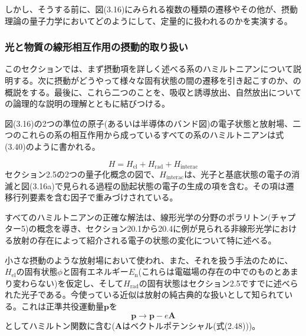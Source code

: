 \documentclass[11pt,a4j,uplatex]{jsarticle}
\begin{document}
しかし、そうする前に、図(3.16)にみられる複数の種類の遷移やその他が、摂動理論の量子力学においてどのようにして、定量的に扱われるのかを実演する。

\newpage
\subsubsection{光と物質の線形相互作用の摂動的取り扱い}
このセクションでは、まず摂動項を詳しく述べる系のハミルトニアンについて説明する。次に摂動がどうやって様々な固有状態の間の遷移を引き起こすのか、の概説をする。最後に、これら二つのことを、吸収と誘導放出、自然放出についての論理的な説明の理解とともに結びつける。

図(3.16)の2つの準位の原子(あるいは半導体のバンド図)の電子状態と放射場、二つのこれらの系の相互作用から成っているすべての系のハミルトニアンは式(3.40)のように書かれる。

\begin{equation}
  H=H_{\mathrm{el}}+H_{\mathrm{rad}}+H_{\mathrm{interac}}\tag{3.40}
\end{equation}
セクション2.5の2つの量子化概念の図で、$H_{\mathrm{interac}}$は、光子と基底状態の電子の消滅と図(3.16a)で見られる過程の励起状態の電子の生成の項を含む。その項は遷移行列要素を含む因子で重みづけされている。

すべてのハミルトニアンの正確な解法は、線形光学の分野のポラリトン(チャプター5)の概念を導き、セクション20.1から20.4に例が見られる非線形光学における放射の存在によって紹介される電子の状態の変化について特に述べる。

小さな摂動のような放射場において使われ、また、それを扱う手法のために、$H_{\mathrm{el}}$の固有状態$\phi$と固有エネルギー$E_{\mathrm{n}}$(これらは電磁場の存在の中でのものとあまり変わらない)を仮定し、そして$H_{\mathrm{rad}}$の固有状態はセクション2.5ですでに述べられた光子である。今使っている近似は放射の純古典的な扱いとして知られている。これは正準共役運動量$\bm{p}$を
\begin{equation}
  \bm{p}\to \bm{p}-e\bm{A}\tag{3.32}
\end{equation}
としてハミルトン関数に含む($\bm{A}$はベクトルポテンシャル(式(2.48)))。
\end{document}
